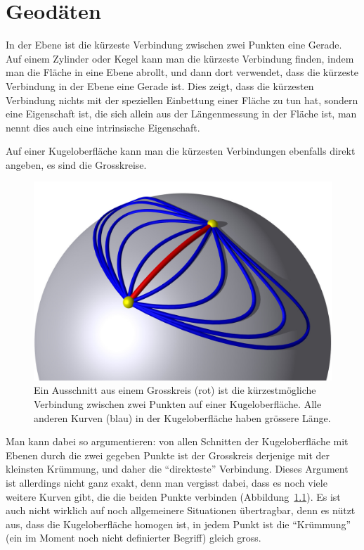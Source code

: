 %
%
%
\chapter{Geodäten
\label{skript:chapter:geodaeten}}
\rhead{}
In der Ebene ist die kürzeste Verbindung zwischen zwei Punkten
eine Gerade.
Auf einem Zylinder oder Kegel kann man die kürzeste Verbindung finden,
indem man die Fläche in eine Ebene abrollt, und dann dort verwendet,
dass die kürzeste Verbindung in der Ebene eine Gerade ist.
Dies zeigt, dass die kürzesten Verbindung nichts mit der speziellen
Einbettung einer Fläche zu tun hat, sondern eine Eigenschaft ist,
die sich allein aus der Längenmessung in der Fläche ist, man nennt
dies auch eine intrinsische Eigenschaft.

Auf einer Kugeloberfläche kann man die kürzesten Verbindungen ebenfalls
direkt angeben, es sind die Grosskreise.
\begin{figure}
\centering
\includegraphics[width=\hsize]{chapters/3d/geodaete.jpg}
\caption{Ein Ausschnitt aus einem Grosskreis (rot) ist die kürzestmögliche
Verbindung zwischen zwei Punkten auf einer Kugeloberfläche.
Alle anderen Kurven (blau) in der Kugeloberfläche haben grössere Länge.
\label{skript:kruemmung:fig:geodaete}}
\end{figure}
Man kann dabei so argumentieren: von allen Schnitten der Kugeloberfläche
mit Ebenen durch die zwei gegeben Punkte ist der Grosskreis derjenige
mit der kleinsten Krümmung, und daher die ``direkteste'' Verbindung.
Dieses Argument ist allerdings nicht ganz exakt, denn man vergisst dabei,
dass es noch viele weitere Kurven gibt, die die beiden Punkte verbinden
(Abbildung~\ref{skript:kruemmung:fig:geodaete}).
Es ist auch nicht wirklich auf noch allgemeinere Situationen übertragbar,
denn es nützt aus, dass die Kugeloberfläche homogen ist, in jedem Punkt
ist die ``Krümmung'' (ein im Moment noch nicht definierter Begriff) 
gleich gross.

